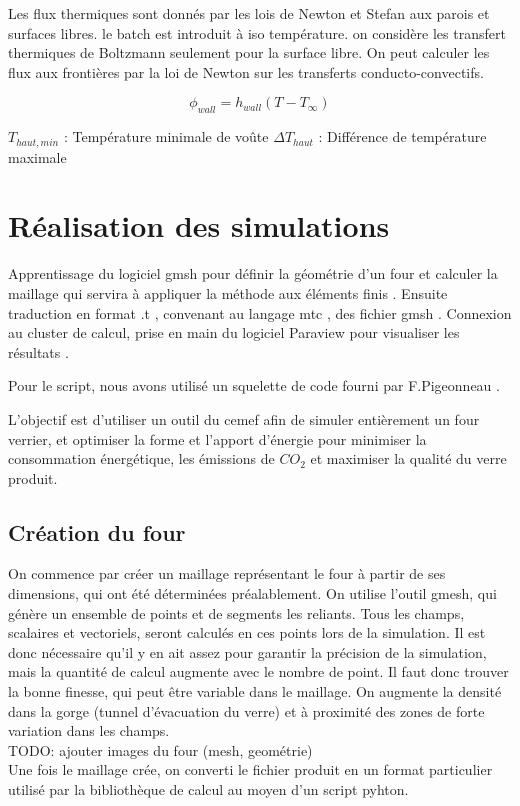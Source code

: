 \documentclass[12pt, a4paper, french, BCOR = 0pt, DIV = 10]{scrartcl}
\begin{document}
    Les flux thermiques sont donnés par les lois de Newton et Stefan aux parois et surfaces libres. le batch est introduit à iso température. on considère les transfert thermiques de Boltzmann seulement pour la surface libre.
    On peut calculer les flux aux frontières par la loi de Newton sur les transferts conducto-convectifs.\\ 
    \begin{center}
        $$
        \phi_{wall} = h_{wall} (T - T_{\infty})
        $$
    \end{center}
    
    
    
    $T_{haut, min}$ : Température minimale de voûte
    \break
    $\Delta T_{haut}$ : Différence de température maximale


	
	\section{Réalisation des simulations}
 	\raggedright
	Apprentissage du logiciel gmsh pour définir la géométrie d'un four et calculer la maillage qui servira à appliquer la méthode aux éléments finis . Ensuite traduction en format .t , convenant au langage mtc , des fichier gmsh . 
	Connexion au cluster de calcul, prise en main du logiciel Paraview pour visualiser les résultats .
	
	Pour le script, nous avons utilisé un squelette de code fourni par F.Pigeonneau .

    L'objectif est d'utiliser un outil du cemef afin de simuler entièrement un four verrier, et optimiser la forme et l'apport d'énergie pour minimiser la consommation énergétique, les émissions de $CO_{2}$ et maximiser la qualité du verre produit.

    \subsection{Création du four}
    On commence par créer un maillage représentant le four à partir de ses dimensions, qui ont été déterminées préalablement. On utilise l'outil gmesh, qui génère un ensemble de points et de segments les reliants. Tous les champs, scalaires et vectoriels, seront calculés en ces points lors de la simulation. Il est donc nécessaire qu'il y en ait assez pour garantir la précision de la simulation, mais la quantité de calcul augmente avec le nombre de point. Il faut donc trouver la bonne finesse, qui peut être variable dans le maillage. On augmente la densité dans la gorge (tunnel d'évacuation du verre) et à proximité des zones de forte variation dans les champs.\\
    TODO: ajouter images du four (mesh, geométrie)\\
    Une fois le maillage crée, on converti le fichier produit en un format particulier utilisé par la bibliothèque de calcul au moyen d'un script pyhton.
\end{document}
